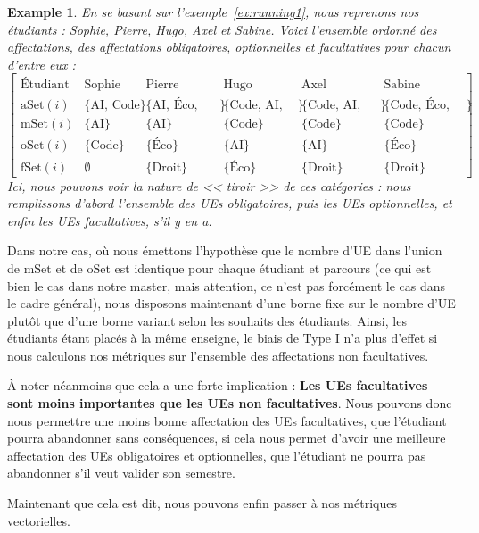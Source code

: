 \documentclass{rapport}
\theoremstyle{definition}
\theoremstyle{remark}
\theoremstyle{plain}
\newtheorem{example}{Example}
\theoremstyle{definition}
\theoremstyle{definition}
\theoremstyle{remark}
\theoremstyle{definition}
\begin{document}
\begin{example}\label{ex:running2}
    En se basant sur l'exemple~\ref{ex:running1}, nous reprenons nos étudiants : Sophie, Pierre, Hugo, Axel et Sabine. Voici l'ensemble ordonné des affectations, des affectations obligatoires, optionnelles et facultatives pour chacun d'entre eux :
    $$
    \begin{bmatrix}
        \text{Étudiant} & \text{Sophie} & \text{Pierre} & \text{Hugo} & \text{Axel} & \text{Sabine}\\
        \text{aSet}(i) & \{\text{AI, Code}\} & \{\text{AI, Éco, Droit}\} & \{\text{Code, AI, Éco}\} & \{\text{Code, AI, Droit}\} & \{\text{Code, Éco, Droit}\}\\
        \text{mSet}(i) & \{\text{AI}\} & \{\text{AI}\} & \{\text{Code}\} & \{\text{Code}\} & \{\text{Code}\}\\
        \text{oSet}(i) & \{\text{Code}\} & \{\text{Éco}\} & \{\text{AI}\} & \{\text{AI}\} & \{\text{Éco}\}\\
        \text{fSet}(i) & \emptyset & \{\text{Droit}\} & \{\text{Éco}\} & \{\text{Droit}\} & \{\text{Droit}\}
    \end{bmatrix}
    $$
    Ici, nous pouvons voir la nature de << tiroir >> de ces catégories : nous remplissons d'abord l'ensemble des UEs obligatoires, puis les UEs optionnelles, et enfin les UEs facultatives, s'il y en a.
\end{example}

Dans notre cas, où nous émettons l'hypothèse que le nombre d'UE dans l'union de $\text{mSet}$ et de $\text{oSet}$ est identique pour chaque étudiant et parcours (ce qui est bien le cas dans notre master, mais attention, ce n'est pas forcément le cas dans le cadre général), nous disposons maintenant d'une borne fixe sur le nombre d'UE plutôt que d'une borne variant selon les souhaits des étudiants.
Ainsi, les étudiants étant placés à la même enseigne, le biais de Type I n'a plus d'effet si nous calculons nos métriques sur l'ensemble des affectations non facultatives.

À noter néanmoins que cela a une forte implication : \textbf{Les UEs facultatives sont moins importantes que les UEs non facultatives}.
Nous pouvons donc nous permettre une moins bonne affectation des UEs facultatives, que l'étudiant pourra abandonner sans conséquences, si cela nous permet d'avoir une meilleure affectation des UEs obligatoires et optionnelles, que l'étudiant ne pourra pas abandonner s'il veut valider son semestre.

Maintenant que cela est dit, nous pouvons enfin passer à nos métriques vectorielles.
\end{document}
